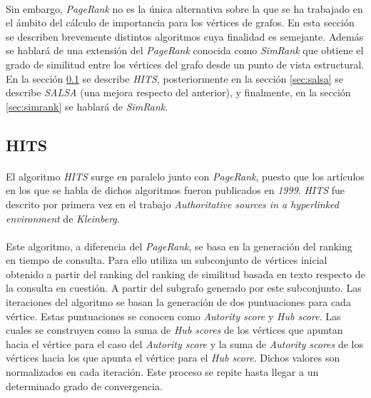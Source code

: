 \documentclass{subfiles}
\begin{document}
      \paragraph{}
      Sin embargo, \emph{PageRank} no es la única alternativa sobre la que se ha trabajado en el ámbito del cálculo de importancia para los vértices de grafos. En esta sección se describen brevemente distintos algoritmos cuya finalidad es semejante. Además se hablará de una extensión del \emph{PageRank} conocida como \emph{SimRank} que obtiene el grado de similitud entre los vértices del grafo desde un punto de vista estructural. En la sección \ref{sec:hits} se describe \emph{HITS}, posteriormente en la sección \ref{sec:salsa} se describe \emph{SALSA} (una mejora respecto del anterior), y finalmente, en la sección \ref{sec:simrank} se hablará de \emph{SimRank}.

      \subsection{HITS}
      \label{sec:hits}

        \paragraph{}
        El algoritmo \emph{HITS} surge en paralelo junto con \emph{PageRank}, puesto que los artículos en los que se habla de dichos algoritmos fueron publicados en \emph{1999}. \emph{HITS} fue descrito por primera vez en el trabajo \emph{Authoritative sources in a hyperlinked environment} \cite{kleinberg1999authoritative} de \emph{Kleinberg}.

        \paragraph{}
        Este algoritmo, a diferencia del \emph{PageRank}, se basa en la generación del ranking en tiempo de consulta. Para ello utiliza un subconjunto de vértices inicial obtenido a partir del ranking del ranking de similitud basada en texto respecto de la consulta en cuestión. A partir del subgrafo generado por este subconjunto. Las iteraciones del algoritmo se basan la generación de dos puntuaciones para cada vértice. Estas puntuaciones se conocen como \emph{Autority score} y \emph{Hub score}. Las cuales se construyen como la suma de \emph{Hub scores} de los vértices que apuntan hacia el vértice para el caso del \emph{Autority score} y la suma de \emph{Autority scores} de los vértices hacia los que apunta el vértice para el \emph{Hub score}. Dichos valores son normalizados en cada iteración. Este proceso se repite hasta llegar a un determinado grado de convergencia.
\end{document}
